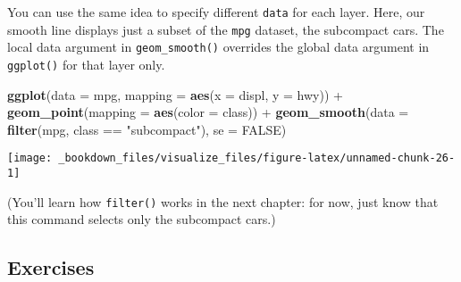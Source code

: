 \documentclass[]{book}
\newenvironment{Shaded}{\begin{snugshade}}{\end{snugshade}}
\newcommand{\KeywordTok}[1]{\textcolor[rgb]{0.13,0.29,0.53}{\textbf{{#1}}}}
\newcommand{\DataTypeTok}[1]{\textcolor[rgb]{0.13,0.29,0.53}{{#1}}}
\newcommand{\StringTok}[1]{\textcolor[rgb]{0.31,0.60,0.02}{{#1}}}
\newcommand{\OtherTok}[1]{\textcolor[rgb]{0.56,0.35,0.01}{{#1}}}
\newcommand{\NormalTok}[1]{{#1}}
\begin{document}
You can use the same idea to specify different \texttt{data} for each
layer. Here, our smooth line displays just a subset of the \texttt{mpg}
dataset, the subcompact cars. The local data argument in
\texttt{geom\_smooth()} overrides the global data argument in
\texttt{ggplot()} for that layer only.

\begin{Shaded}
\begin{Highlighting}[]
\KeywordTok{ggplot}\NormalTok{(}\DataTypeTok{data =} \NormalTok{mpg, }\DataTypeTok{mapping =} \KeywordTok{aes}\NormalTok{(}\DataTypeTok{x =} \NormalTok{displ, }\DataTypeTok{y =} \NormalTok{hwy)) +}\StringTok{ }
\StringTok{  }\KeywordTok{geom_point}\NormalTok{(}\DataTypeTok{mapping =} \KeywordTok{aes}\NormalTok{(}\DataTypeTok{color =} \NormalTok{class)) +}\StringTok{ }
\StringTok{  }\KeywordTok{geom_smooth}\NormalTok{(}\DataTypeTok{data =} \KeywordTok{filter}\NormalTok{(mpg, class ==}\StringTok{ "subcompact"}\NormalTok{), }\DataTypeTok{se =} \OtherTok{FALSE}\NormalTok{)}
\end{Highlighting}
\end{Shaded}

\begin{center}\texttt{[image: \_bookdown\_files/visualize\_files/figure-latex/unnamed-chunk-26-1]} \end{center}

(You'll learn how \texttt{filter()} works in the next chapter: for now,
just know that this command selects only the subcompact cars.)

\subsection{Exercises}\label{exercises-3}
\end{document}
